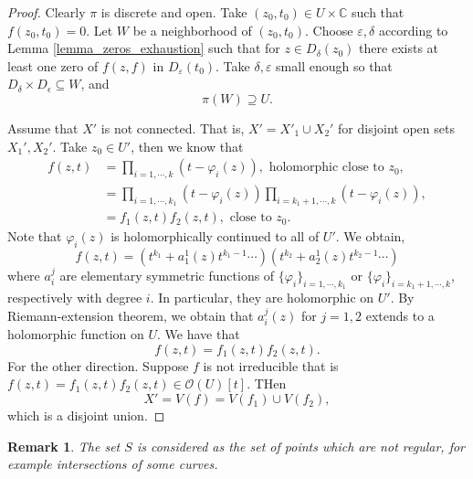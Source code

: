 \documentclass{article}
\newtheorem{remark}{Remark}[section]
\newcommand{\C}[0]{\mathbb{C}}
\begin{document}
\begin{proof}
  Clearly $\pi$ is discrete and open. Take $(z_0,t_0)\in U\times \C$ such that $f(z_0,t_0)=0$. Let $W$ be a neighborhood of $(z_0,t_0)$. Choose $\varepsilon,\delta$ according to Lemma \ref{lemma_zeros_exhaustion} such that 
  for $z\in D_\delta(z_0)$ there exists at least one zero of $f(z,f)$ in $D_\varepsilon(t_0)$. Take $\delta,\varepsilon$ small enough so that $D_\delta\times D_\epsilon\subseteq W$, and 
  \begin{equation*}
  \pi(W)\supseteq U.
  \end{equation*}
  \par Assume that $X'$ is not connected. That is, $X'= X'_1\cup X_2'$ for disjoint open sets $X_1',X_2'$. Take $z_0\in U'$, then we know that 
  \begin{align*}
    f(z,t)& = \prod_{i=1,\cdots,k}(t-\varphi_i(z)),\text{ holomorphic close to $z_0$},\\
    & = \prod_{i=1,\cdots,k_1}(t-\varphi_i(z))\prod_{i=k_1+1,\cdots,k}(t-\varphi_i(z)),\\
    & = f_1(z,t)f_2(z,t),\text{ close to $z_0$}.
  \end{align*}
  Note that $\varphi_i(z)$ is holomorphically continued to all of $U'$. We obtain,
  \begin{equation*}
    f(z,t) = (t^{k_1}+a_1^1(z)t^{k_1-1}\cdots)(t^{k_2}+a_2^1(z)t^{k_2-1}\cdots)
  \end{equation*}
  where $a_i^j$ are elementary symmetric functions of $\{\varphi_i\}_{i=1,\cdots,k_1}$ or $\{\varphi_{i}\}_{i=k_1+1,\cdots,k}$, respectively with degree $i$.
  In particular, they are holomorphic on $U'$. By Riemann-extension theorem, we obtain that $a_i^{j}(z)$ for $j=1,2$ extends to a holomorphic function on $U$. We have that 
  \begin{equation*}
    f(z,t) = f_1(z,t)f_2(z,t).
  \end{equation*}
  For the other direction. Suppose $f$ is not irreducible that is $f(z,t) = f_1(z,t)f_2(z,t)\in\mathcal{O}(U)[t]$. THen 
  \begin{equation*}
    X' = V(f) = V(f_1)\cup V(f_2),
  \end{equation*}
  which is a disjoint union.
\end{proof}

\begin{remark}
  The set $S$ is considered as the set of points which are not regular, for example intersections of some curves.
\end{remark}
    
\end{document}

